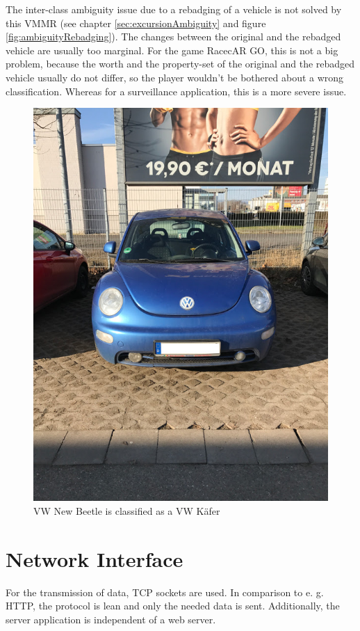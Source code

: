 The inter-class ambiguity issue due to a rebadging of a vehicle is not solved by this VMMR (see chapter \ref{sec:excursionAmbiguity} and figure \ref{fig:ambiguityRebadging}). The changes between the original and the rebadged vehicle are usually too marginal. For the game RacecAR GO, this is not a big problem, because the worth and the property-set of the original and the rebadged vehicle usually do not differ, so the player wouldn't be bothered about a wrong classification. Whereas for a surveillance application, this is a more severe issue.
\begin{figure}[btph]
  \centering
        \includegraphics[width=.2\linewidth]{gfx/test_ambiguity}
        \caption{VW New Beetle is classified as a VW K\"afer}
        \label{fig:testAmbiguity}
\end{figure}

\section{Network Interface}\label{sec:network}
For the transmission of data, TCP sockets are used. In comparison to e. g. HTTP, the protocol is lean and only the needed data is sent. Additionally, the server application is independent of a web server.

